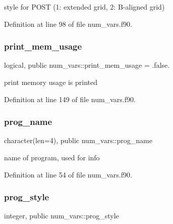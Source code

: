 style for P\+O\+ST (1\+: extended grid, 2\+: B-\/aligned grid) 



Definition at line 98 of file num\+\_\+vars.\+f90.

\mbox{\label{namespacenum__vars_a28bf4f706f43af630ecc697dec01654c}} 
\subsubsection{\texorpdfstring{print\+\_\+mem\+\_\+usage}{print\_mem\_usage}}
{\footnotesize\ttfamily logical, public num\+\_\+vars\+::print\+\_\+mem\+\_\+usage = .false.}



print memory usage is printed 



Definition at line 149 of file num\+\_\+vars.\+f90.

\mbox{\label{namespacenum__vars_a7548fedc0d8f3102844aded2e6c11f82}} 
\subsubsection{\texorpdfstring{prog\+\_\+name}{prog\_name}}
{\footnotesize\ttfamily character(len=4), public num\+\_\+vars\+::prog\+\_\+name}



name of program, used for info 



Definition at line 54 of file num\+\_\+vars.\+f90.

\mbox{\label{namespacenum__vars_a50245a345efb453eda46b3fe98b702e8}} 
\subsubsection{\texorpdfstring{prog\+\_\+style}{prog\_style}}
{\footnotesize\ttfamily integer, public num\+\_\+vars\+::prog\+\_\+style}



